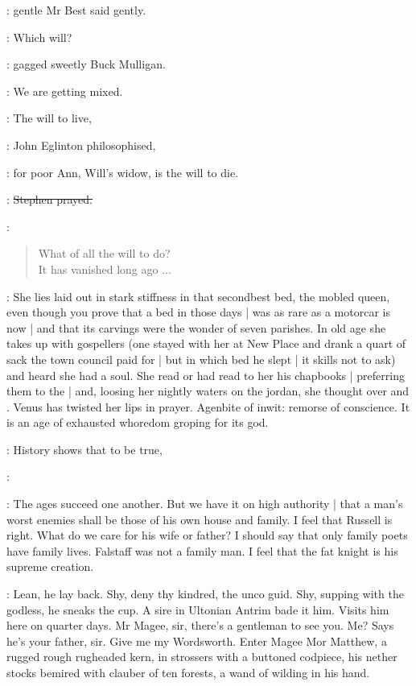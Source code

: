 :
gentle Mr Best said gently.

\mulligan:
Which will?

:
gagged sweetly Buck Mulligan.

\mulligan:
We are getting mixed.

\eglinton:
The will to live,

:
John Eglinton philosophised,

\eglinton:
for poor Ann,
Will's widow,
is the will to die.

\Stephen:
\sout{Stephen prayed.}

\Stephen:
\begin{verse}
    What of all the will to do? \\
    It has vanished long ago ...
\end{verse}

\Stephen:
She lies laid out in stark stiffness in that secondbest bed,
the mobled queen,
even though you prove that a bed in those days |
was as rare as a motorcar is now |
and that its carvings were the wonder of seven parishes.
In old age she takes up with gospellers
(one stayed with her at New Place
and drank a quart of sack the town council paid for |
but in which bed he slept |
it skills not to ask)
and heard she had a soul.
She read or had read to her his chapbooks |
preferring them to the  |
and, loosing her nightly waters on the jordan,
she thought over 
and .
Venus has twisted her lips in prayer.
Agenbite of inwit:
remorse of conscience.
It is an age of exhausted whoredom groping for its god.

\eglinton:
History shows that to be true,

:

\eglinton:
The ages succeed one another.
But we have it on high authority |
that a man's worst enemies shall be those of his own house and family.
I feel that Russell is right.
What do we care for his wife or father?
I should say that only family poets have family lives.
Falstaff was not a family man.
I feel that the fat knight is his supreme creation.

\StephenInt:
Lean, he lay back.
Shy, deny thy kindred,
the unco guid.
Shy, supping with the godless,
he sneaks the cup.
A sire in Ultonian Antrim bade it him.
Visits him here on quarter days.
Mr Magee, sir,
there's a gentleman to see you.
Me?
Says he's your father, sir.
Give me my Wordsworth.
Enter Magee Mor Matthew,
a rugged rough rugheaded kern,
in strossers with a buttoned codpiece,
his nether stocks bemired with clauber of ten forests,
a wand of wilding in his hand.

